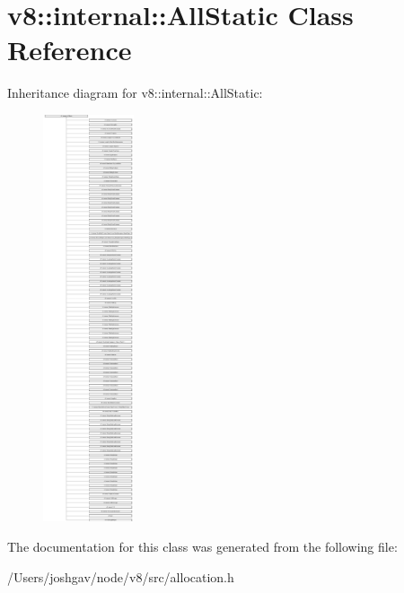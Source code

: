 \hypertarget{classv8_1_1internal_1_1_all_static}{}\section{v8\+:\+:internal\+:\+:All\+Static Class Reference}
\label{classv8_1_1internal_1_1_all_static}
Inheritance diagram for v8\+:\+:internal\+:\+:All\+Static\+:\begin{figure}[H]
\begin{center}
\leavevmode
\includegraphics[height=12.000000cm]{classv8_1_1internal_1_1_all_static}
\end{center}
\end{figure}


The documentation for this class was generated from the following file\+:\begin{DoxyCompactItemize}
\item 
/\+Users/joshgav/node/v8/src/allocation.\+h\end{DoxyCompactItemize}
